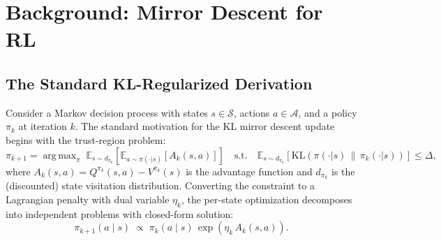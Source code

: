 \documentclass[11pt]{article}
\theoremstyle{definition}
\theoremstyle{remark}
\newcommand{\KL}{\mathrm{KL}}
\newcommand{\E}{\mathbb{E}}
\DeclareMathOperator*{\argmax}{arg\,max}
\begin{document}
\section{Background: Mirror Descent for RL}
\label{sec:background}

\subsection{The Standard KL-Regularized Derivation}

Consider a Markov decision process with states $s \in \mathcal{S}$, actions $a \in \mathcal{A}$, and a policy $\pi_k$ at iteration $k$. The standard motivation for the KL mirror descent update begins with the trust-region problem:
\begin{equation}\label{eq:trust-region}
  \pi_{k+1} = \argmax_{\pi} \; \E_{s \sim d_{\pi_k}}\!\left[\E_{a \sim \pi(\cdot|s)}[A_k(s,a)]\right]
  \quad \text{s.t.} \quad \E_{s \sim d_{\pi_k}}\!\left[\KL\!\left(\pi(\cdot|s)\,\|\,\pi_k(\cdot|s)\right)\right] \le \Delta,
\end{equation}
where $A_k(s,a) = Q^{\pi_k}(s,a) - V^{\pi_k}(s)$ is the advantage function and $d_{\pi_k}$ is the (discounted) state visitation distribution. Converting the constraint to a Lagrangian penalty with dual variable $\eta_k$, the per-state optimization decomposes into independent problems with closed-form solution:
\begin{equation}\label{eq:mirror-descent}
  \pi_{k+1}(a \mid s) \;\propto\; \pi_k(a \mid s)\,\exp\!\left(\eta_k\, A_k(s,a)\right).
\end{equation}
\end{document}
